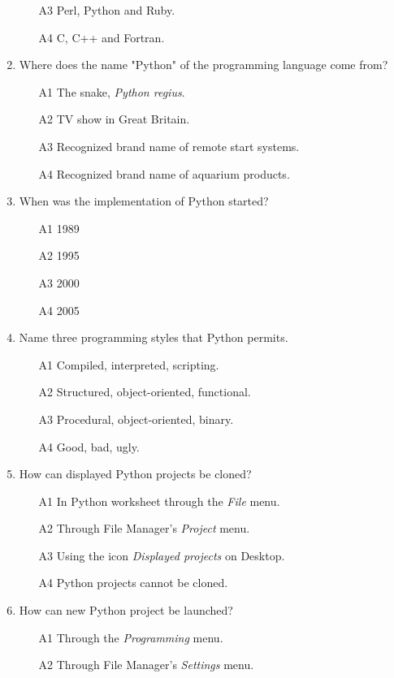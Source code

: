 \documentclass[article,A4,12pt]{llncs}
\begin{document}
\begin{enumerate}
\begin{enumerate}
\item[A3] Perl, Python and Ruby. 
\item[A4] C, C++ and Fortran.
\end{enumerate}
\item Where does the name "Python" of the programming language come from?
\begin{enumerate}
\item[A1] The snake, {\em Python regius}.
\item[A2] TV show in Great Britain.
\item[A3] Recognized brand name of remote start systems.
\item[A4] Recognized brand name of aquarium products.
\end{enumerate}
\item When was the implementation of Python started?
\begin{enumerate}
\item[A1] 1989
\item[A2] 1995
\item[A3] 2000
\item[A4] 2005
\end{enumerate}
\item Name three programming styles that Python permits.
\begin{enumerate}
\item[A1] Compiled, interpreted, scripting.
\item[A2] Structured, object-oriented, functional.
\item[A3] Procedural, object-oriented, binary.
\item[A4] Good, bad, ugly.
\end{enumerate}
\item How can displayed Python projects be cloned?
\begin{enumerate}
\item[A1] In Python worksheet through the {\em File} menu.
\item[A2] Through File Manager's {\em Project} menu.
\item[A3] Using the icon {\em Displayed projects} on Desktop.
\item[A4] Python projects cannot be cloned.
\end{enumerate}
\item How can new Python project be launched?
\begin{enumerate}
\item[A1] Through the {\em Programming} menu.
\item[A2] Through File Manager's {\em Settings} menu.

\end{enumerate}
\end{enumerate}
\end{document}
